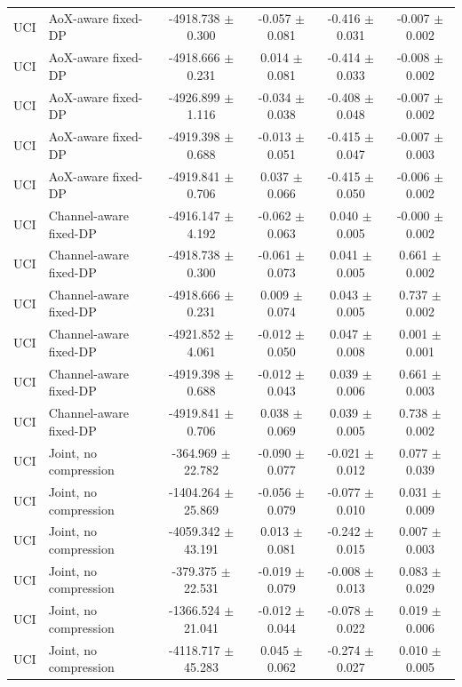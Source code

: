 \begin{table}[t]
\begin{tabular}{llcccc}
UCI & AoX-aware fixed-DP & -4918.738 $\pm$ 0.300 & -0.057 $\pm$ 0.081 & -0.416 $\pm$ 0.031 & -0.007 $\pm$ 0.002 \\
UCI & AoX-aware fixed-DP & -4918.666 $\pm$ 0.231 & 0.014 $\pm$ 0.081 & -0.414 $\pm$ 0.033 & -0.008 $\pm$ 0.002 \\
UCI & AoX-aware fixed-DP & -4926.899 $\pm$ 1.116 & -0.034 $\pm$ 0.038 & -0.408 $\pm$ 0.048 & -0.007 $\pm$ 0.002 \\
UCI & AoX-aware fixed-DP & -4919.398 $\pm$ 0.688 & -0.013 $\pm$ 0.051 & -0.415 $\pm$ 0.047 & -0.007 $\pm$ 0.003 \\
UCI & AoX-aware fixed-DP & -4919.841 $\pm$ 0.706 & 0.037 $\pm$ 0.066 & -0.415 $\pm$ 0.050 & -0.006 $\pm$ 0.002 \\
UCI & Channel-aware fixed-DP & -4916.147 $\pm$ 4.192 & -0.062 $\pm$ 0.063 & 0.040 $\pm$ 0.005 & -0.000 $\pm$ 0.002 \\
UCI & Channel-aware fixed-DP & -4918.738 $\pm$ 0.300 & -0.061 $\pm$ 0.073 & 0.041 $\pm$ 0.005 & 0.661 $\pm$ 0.002 \\
UCI & Channel-aware fixed-DP & -4918.666 $\pm$ 0.231 & 0.009 $\pm$ 0.074 & 0.043 $\pm$ 0.005 & 0.737 $\pm$ 0.002 \\
UCI & Channel-aware fixed-DP & -4921.852 $\pm$ 4.061 & -0.012 $\pm$ 0.050 & 0.047 $\pm$ 0.008 & 0.001 $\pm$ 0.001 \\
UCI & Channel-aware fixed-DP & -4919.398 $\pm$ 0.688 & -0.012 $\pm$ 0.043 & 0.039 $\pm$ 0.006 & 0.661 $\pm$ 0.003 \\
UCI & Channel-aware fixed-DP & -4919.841 $\pm$ 0.706 & 0.038 $\pm$ 0.069 & 0.039 $\pm$ 0.005 & 0.738 $\pm$ 0.002 \\
UCI & Joint, no compression & -364.969 $\pm$ 22.782 & -0.090 $\pm$ 0.077 & -0.021 $\pm$ 0.012 & 0.077 $\pm$ 0.039 \\
UCI & Joint, no compression & -1404.264 $\pm$ 25.869 & -0.056 $\pm$ 0.079 & -0.077 $\pm$ 0.010 & 0.031 $\pm$ 0.009 \\
UCI & Joint, no compression & -4059.342 $\pm$ 43.191 & 0.013 $\pm$ 0.081 & -0.242 $\pm$ 0.015 & 0.007 $\pm$ 0.003 \\
UCI & Joint, no compression & -379.375 $\pm$ 22.531 & -0.019 $\pm$ 0.079 & -0.008 $\pm$ 0.013 & 0.083 $\pm$ 0.029 \\
UCI & Joint, no compression & -1366.524 $\pm$ 21.041 & -0.012 $\pm$ 0.044 & -0.078 $\pm$ 0.022 & 0.019 $\pm$ 0.006 \\
UCI & Joint, no compression & -4118.717 $\pm$ 45.283 & 0.045 $\pm$ 0.062 & -0.274 $\pm$ 0.027 & 0.010 $\pm$ 0.005 \\

\end{tabular}
\end{table}
